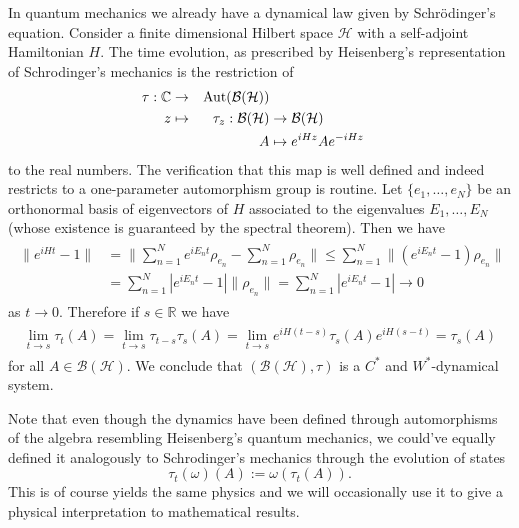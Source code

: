\begin{example}\label{ex:schrodinger}
In quantum mechanics we already have a dynamical law given by Schrödinger's equation. Consider a finite dimensional Hilbert space $\mathcal{H}$ with a self-adjoint Hamiltonian $H$. The time evolution, as prescribed by Heisenberg's representation of Schrodinger's mechanics is the restriction of
\begin{alignat}{2}
\tau:\mathbb{C}&\rightarrow&\operatorname{Aut}(\mathcal{B}(\mathcal{H})) \nonumber \\
z&\mapsto&\tau_z:\mathcal{B}(\mathcal{H})&\rightarrow\mathcal{B}(\mathcal{H}) \\
&&A&\mapsto e^{iHz}Ae^{-iHz} \nonumber
\end{alignat}
to the real numbers. The verification that this map is well defined and indeed restricts to a one-parameter automorphism group is routine.
Let $\{e_1,\dots,e_N\}$ be an orthonormal basis of eigenvectors of $H$ associated to the eigenvalues $E_1,\dots,E_N$ (whose existence is guaranteed by the spectral theorem). Then we have
\begin{align}
\begin{split}
\|e^{iHt}-1\|&=\|\sum_{n=1}^Ne^{iE_nt}\rho_{e_n}-\sum_{n=1}^N \rho_{e_n}\|\leq\sum_{n=1}^N \|\left(e^{iE_nt}-1\right)\rho_{e_n}\| \\
&= \sum_{n=1}^N|e^{iE_nt}-1|\|\rho_{e_n}\|=\sum_{n=1}^N|e^{iE_nt}-1|\rightarrow 0
\end{split}
\end{align}
as $t\rightarrow 0$. Therefore if $s\in\mathbb{R}$ we have
\begin{align}
\begin{split}
\lim_{t\rightarrow s}\tau_t(A)=\lim_{t\rightarrow s}\tau_{t-s}\tau_s(A)=\lim_{t\rightarrow s}e^{iH(t-s)}\tau_s(A)e^{iH(s-t)}=\tau_s(A)
\end{split}
\end{align}
for all $A\in \mathcal{B}(\mathcal{H})$. We conclude that $(\mathcal{B}(\mathcal{H}),\tau)$ is a $C^*$ and $W^*$-dynamical system.
\end{example} 

Note that even though the dynamics have been defined through automorphisms of the algebra resembling Heisenberg's quantum mechanics, we could've equally defined it analogously to Schrodinger's mechanics through the evolution of states
\begin{equation}
\tau_t(\omega)(A):=\omega(\tau_t(A)).
\end{equation}
This is of course yields the same physics and we will occasionally use it to give a physical interpretation to mathematical results. 